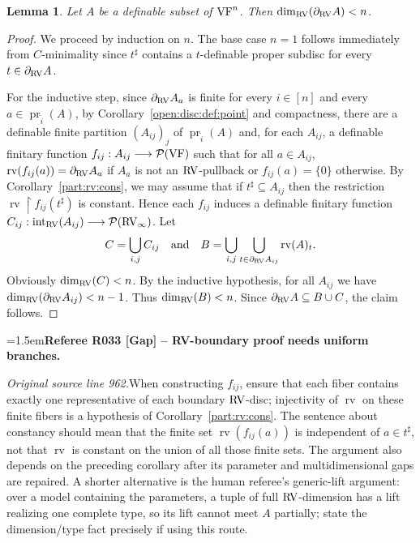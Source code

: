 \documentclass[12pt]{amsart}
\newcommand{\RefereeRemark}[4]{%
  \par\medskip\begingroup\normalfont\small\color{RefereePurple}%
  \emergencystretch=1.5em\noindent\textbf{Referee R#1 [#2] -- #3.}\par\nobreak\noindent #4\par
  \endgroup\medskip
}
\theoremstyle{plain}
\newtheorem{lem}[thm]{Lemma}
\theoremstyle{definition}
\theoremstyle{remark}
\numberwithin{equation}{section}
\theoremstyle{plain}
\newcommand{\VF}{\textup{VF}}
\newcommand{\RV}{\textup{RV}}
\DeclareMathOperator{\pr}{pr}
\newcommand{\cmin}{$C$\nobreakdash}
\newcommand{\dand}{\quad \text{and} \quad}
\newcommand{\0}{\emptyset}
\newcommand{\mdl}[1]{\mathcal{#1}}  %
\newcommand{\rest}{\upharpoonright}
\newcommand{\fun}{\longrightarrow}
\newcommand{\sub}{\subseteq}
\DeclareMathOperator{\rv}{rv}
\DeclareMathOperator{\ito}{int}
\begin{document}
\begin{lem}\label{RV:bou:dim}
Let $A$ be a definable subset of $\VF^n$. Then $\dim_{\RV}(\partial_{\RV} A) < n$.
\end{lem}
\begin{proof}
We proceed by induction on $n$. The base case $n=1$  follows immediately from \cmin-minimality since $t^\sharp$ contains a $t$-definable proper subdisc for every $t \in \partial_{\RV} A$.

For the inductive step, since $\partial_{\RV} A_a$ is finite for every $i \in [n]$ and every $a \in \pr_{\tilde i}(A)$, by Corollary~\ref{open:disc:def:point} and compactness, there are a definable finite partition $(A_{ij})_j$ of $\pr_{\tilde i}(A)$ and, for each $A_{ij}$, a definable finitary function $f_{ij} : A_{ij} \fun \mdl P(\VF)$ such that for all $a \in A_{ij}$, $\rv(f_{ij}(a)) = \partial_{\RV} A_a$ if $A_a$ is not an $\RV$-pullback or $f_{ij}(a) = \{0\}$ otherwise. By Corollary~\ref{part:rv:cons}, we may assume that if $t^\sharp \sub A_{ij}$ then the restriction $\rv \rest f_{ij}(t^\sharp)$ is constant. Hence each $f_{ij}$ induces a definable finitary function $C_{ij} : \ito_{\RV}(A_{ij}) \fun \mdl P(\RV_\infty)$.
Let
\[
 C = \bigcup_{i, j} C_{ij} \dand B = \bigcup_{i,j} \bigcup_{t \in \partial_{\RV} A_{ij}} \rv(A)_t.
\]
Obviously $\dim_{\RV}(C) < n$. By the inductive hypothesis, for all $A_{ij}$ we have $\dim_{\RV}(\partial_{\RV} A_{ij}) < n-1$. Thus $\dim_{\RV}(B) < n$. Since $\partial_{\RV} A \sub B \cup C$, the claim follows.
\end{proof}

\RefereeRemark{033}{Gap}{RV-boundary proof needs uniform branches}{%
\textit{Original source line 962.}\quad When constructing $f_{ij}$, ensure that each fiber contains exactly one representative of each boundary $\RV$-disc; injectivity of $\rv$ on these finite fibers is a hypothesis of Corollary~\ref{part:rv:cons}. The sentence about constancy should mean that the finite set $\rv(f_{ij}(a))$ is independent of $a\in t^\sharp$, not that $\rv$ is constant on the union of all those finite sets. The argument also depends on the preceding corollary after its parameter and multidimensional gaps are repaired. A shorter alternative is the human referee's generic-lift argument: over a model containing the parameters, a tuple of full $\RV$-dimension has a lift realizing one complete type, so its lift cannot meet $A$ partially; state the dimension/type fact precisely if using this route.
}
\end{document}
